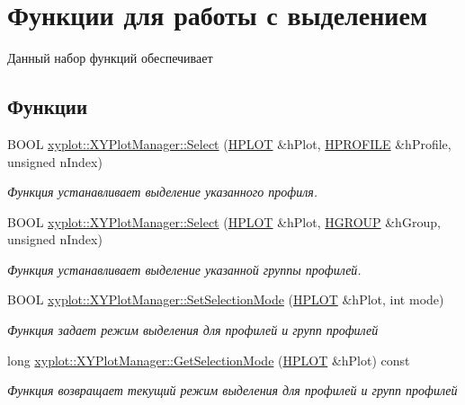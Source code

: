 \hypertarget{group__gr_select}{\section{Функции для работы с выделением}
\label{group__gr_select}
}


Данный набор функций обеспечивает  


\subsection*{Функции}
\begin{DoxyCompactItemize}
\item 
B\-O\-O\-L \hyperlink{group__gr_select_ga7851d700a43f68d0738617ee01afdd73}{xyplot\-::\-X\-Y\-Plot\-Manager\-::\-Select} (\hyperlink{classxyplot_1_1_h_p_l_o_t}{H\-P\-L\-O\-T} \&h\-Plot, \hyperlink{classxyplot_1_1_h_p_r_o_f_i_l_e}{H\-P\-R\-O\-F\-I\-L\-E} \&h\-Profile, unsigned n\-Index)
\begin{DoxyCompactList}\small\item\em Функция устанавливает выделение указанного профиля. \end{DoxyCompactList}\item 
B\-O\-O\-L \hyperlink{group__gr_select_ga155570b64a87c676f3cf023ad8ed42a1}{xyplot\-::\-X\-Y\-Plot\-Manager\-::\-Select} (\hyperlink{classxyplot_1_1_h_p_l_o_t}{H\-P\-L\-O\-T} \&h\-Plot, \hyperlink{classxyplot_1_1_h_g_r_o_u_p}{H\-G\-R\-O\-U\-P} \&h\-Group, unsigned n\-Index)
\begin{DoxyCompactList}\small\item\em Функция устанавливает выделение указанной группы профилей. \end{DoxyCompactList}\item 
B\-O\-O\-L \hyperlink{group__gr_select_gadcf35c2c2d175cd20d607a05b069fa42}{xyplot\-::\-X\-Y\-Plot\-Manager\-::\-Set\-Selection\-Mode} (\hyperlink{classxyplot_1_1_h_p_l_o_t}{H\-P\-L\-O\-T} \&h\-Plot, int mode)
\begin{DoxyCompactList}\small\item\em Функция задает режим выделения для профилей и групп профилей \end{DoxyCompactList}\item 
long \hyperlink{group__gr_select_ga0e7cc28041a0ca7df37af0a4ebd126a4}{xyplot\-::\-X\-Y\-Plot\-Manager\-::\-Get\-Selection\-Mode} (\hyperlink{classxyplot_1_1_h_p_l_o_t}{H\-P\-L\-O\-T} \&h\-Plot) const 
\begin{DoxyCompactList}\small\item\em Функция возвращает текущий режим выделения для профилей и групп профилей \end{DoxyCompactList}\item 

\end{DoxyCompactItemize}

